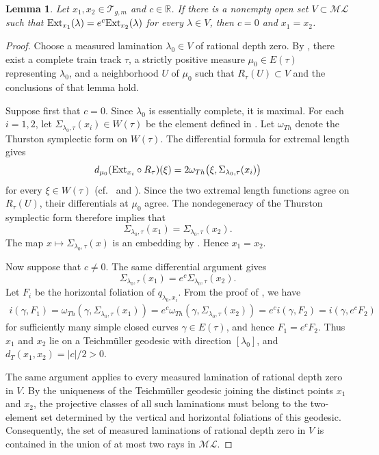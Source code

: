 \documentclass[dvipdfmx]{amsart}
\newtheorem{lemma}{Lemma}[section]
\theoremstyle{remark}
\newcommand{\ext}{{\rm Ext}}
\newcommand{\teich}{\mathcal{T}}
\newcommand{\ml}{\mathcal{ML}}
\begin{document}
\begin{lemma}
\label{lem:coincidence}
Let $x_1,x_2\in\teich_{g,m}$ and $c\in\mathbb R$. If there is a nonempty open set $V\subset\ml$ such that $\ext_{x_1}(\lambda)=e^c\ext_{x_2}(\lambda)$ for every $\lambda\in V$, then $c=0$ and $x_1=x_2$.
\end{lemma}

\begin{proof}
Choose a measured lamination $\lambda_0\in V$ of rational depth zero. By , there exist a complete train track $\tau$, a strictly positive measure $\mu_0\in E(\tau)$ representing $\lambda_0$, and a neighborhood $U$ of $\mu_0$ such that $R_\tau(U)\subset V$ and the conclusions of that lemma hold.

Suppose first that $c=0$.
Since $\lambda_0$ is essentially complete, it is maximal. For each $i=1,2$, let $\Sigma_{\lambda_0,\tau}(x_i)\in W(\tau)$ be the element defined in \cite[\S6.2]{MiyachiOhshika2017}. Let $\omega_{Th}$ denote the Thurston symplectic form on $W(\tau)$.
The differential formula for extremal length gives
\[
d_{\mu_0}(\ext_{x_i}\circ R_\tau)(\xi)
=2\omega_{Th}\bigl(\xi,\Sigma_{\lambda_0,\tau}(x_i)\bigr)
\]
for every $\xi\in W(\tau)$ (cf.\ \cite[Theorem 1.1]{Miyachi2013b} and \cite[(1.1) and (6.5)]{MiyachiOhshika2017}). Since the two extremal length functions agree on $R_\tau(U)$, their differentials at $\mu_0$ agree. The nondegeneracy of the Thurston symplectic form therefore implies that
\[
\Sigma_{\lambda_0,\tau}(x_1)
=\Sigma_{\lambda_0,\tau}(x_2).
\]
The map $x\mapsto\Sigma_{\lambda_0,\tau}(x)$ is an embedding by \cite[Th\'eor\`eme 6.1]{MiyachiOhshika2017}. Hence $x_1=x_2$.

Now suppose that $c\ne0$. The same differential argument gives
\[
\Sigma_{\lambda_0,\tau}(x_1)
=e^c\Sigma_{\lambda_0,\tau}(x_2).
\]
Let $F_i$ be the horizontal foliation of $q_{\lambda_0,x_i}$.
From the proof of \cite[Th\'eor\`eme 6.1]{MiyachiOhshika2017}, we have
\begin{align*}
i(\gamma,F_1)=\omega_{Th}(\gamma,\Sigma_{\lambda_0,\tau}(x_1))=e^c\omega_{Th}(\gamma,\Sigma_{\lambda_0,\tau}(x_2))
=e^ci(\gamma,F_2)=i(\gamma,e^cF_2)
\end{align*}
for sufficiently many simple closed curves $\gamma\in E(\tau)$, and hence $F_1=e^cF_2$.
Thus $x_1$ and $x_2$ lie on a Teichm\"uller geodesic
with direction $[\lambda_0]$, and
$d_T(x_1,x_2)=|c|/2>0$.

The same argument applies to every measured lamination
of rational depth zero in $V$.
By the uniqueness of the Teichm\"uller geodesic joining
the distinct points $x_1$ and $x_2$, the projective
classes of all such laminations must belong to the
two-element set determined by the vertical and horizontal
foliations of this geodesic.
Consequently, the set of measured laminations of rational
depth zero in $V$ is contained in the union of at most
two rays in $\ml$.


\end{proof}
\end{document}
